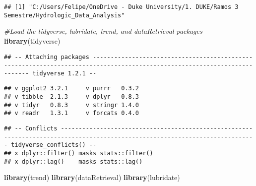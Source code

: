 \documentclass[]{article}
\newenvironment{Shaded}{\begin{snugshade}}{\end{snugshade}}
\newcommand{\CommentTok}[1]{\textcolor[rgb]{0.56,0.35,0.01}{\textit{#1}}}
\newcommand{\DataTypeTok}[1]{\textcolor[rgb]{0.13,0.29,0.53}{#1}}
\newcommand{\KeywordTok}[1]{\textcolor[rgb]{0.13,0.29,0.53}{\textbf{#1}}}
\newcommand{\NormalTok}[1]{#1}
\newcommand{\OperatorTok}[1]{\textcolor[rgb]{0.81,0.36,0.00}{\textbf{#1}}}
\newcommand{\OtherTok}[1]{\textcolor[rgb]{0.56,0.35,0.01}{#1}}
\begin{document}
\begin{Shaded}
\end{Shaded}

\begin{verbatim}
## [1] "C:/Users/Felipe/OneDrive - Duke University/1. DUKE/Ramos 3 Semestre/Hydrologic_Data_Analysis"
\end{verbatim}

\begin{Shaded}
\begin{Highlighting}[]
\CommentTok{#Load the tidyverse, lubridate, trend, and dataRetrieval packages}
\KeywordTok{library}\NormalTok{(tidyverse)}
\end{Highlighting}
\end{Shaded}

\begin{verbatim}
## -- Attaching packages -------------------------------------------------------------------------------------------------------------------------- tidyverse 1.2.1 --
\end{verbatim}

\begin{verbatim}
## v ggplot2 3.2.1     v purrr   0.3.2
## v tibble  2.1.3     v dplyr   0.8.3
## v tidyr   0.8.3     v stringr 1.4.0
## v readr   1.3.1     v forcats 0.4.0
\end{verbatim}

\begin{verbatim}
## -- Conflicts ----------------------------------------------------------------------------------------------------------------------------- tidyverse_conflicts() --
## x dplyr::filter() masks stats::filter()
## x dplyr::lag()    masks stats::lag()
\end{verbatim}

\begin{Shaded}
\begin{Highlighting}[]
\KeywordTok{library}\NormalTok{(trend)}
\KeywordTok{library}\NormalTok{(dataRetrieval)}
\KeywordTok{library}\NormalTok{(lubridate)}
\end{Highlighting}
\end{Shaded}
\end{document}
